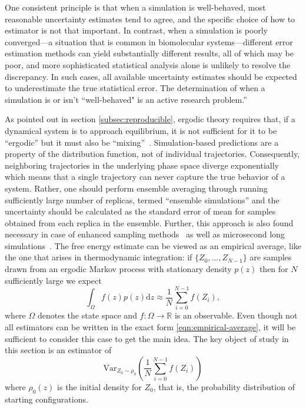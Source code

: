 \documentclass[9pt,bestpractices]{livecoms}
\begin{document}
One consistent principle is that when a simulation is well-behaved, most reasonable uncertainty estimates tend to agree, and the specific choice of how to estimator is not that important.  In contrast, when a simulation is poorly converged---a situation that is common in biomolecular systems---different error estimation methods can yield substantially different results, all of which may be poor, and more sophisticated statistical analysis alone is unlikely to resolve the discrepancy. In such cases, all available uncertainty estimates should be expected to underestimate the true statistical error. The determination of when a simulation is or isn't ``well-behaved" is an active research problem.'' %

As pointed out in section \ref{subsec:reproducible}, ergodic theory requires that, if a dynamical system is to approach equilibrium, it is not sufficient for it to be ``ergodic'' but it must also be ``mixing''~\cite{coveney2016, mdbook2025}. Simulation-based predictions are a property of the distribution function, not of individual trajectories. Consequently, neighboring trajectories in the underlying phase space diverge exponentially which means that a single trajectory can never capture the true behavior of a system. Rather, one should perform ensemble averaging through running sufficiently large number of replicas, termed ``ensemble simulations'' and the uncertainty should be calculated as the standard error of mean for samples obtained from each replica in the ensemble. Further, this approach is also found necessary in case of enhanced sampling methods~\cite{bhati2018} as well as microsecond long simulations~\cite{bhati2023}.
The free energy estimate can be viewed as an empirical average, like the one that arises in thermodynamic integration: if $\{Z_0, \dots, Z_{N-1}\}$ are samples drawn from an ergodic Markov process with stationary density $p(z)$ then for $N$ sufficiently large we expect 
\begin{equation}
    \int_\Omega f(z) p(z) \mathrm{d}z\approx \frac{1}{N}\sum_{i=0}^{N-1} f(Z_i), \label{eqn:empirical-average}
\end{equation}
where $\Omega$ denotes the state space and $f : \Omega \rightarrow \mathbb{R}$ is an observable. Even though not all estimators can be written in the exact form \eqref{eqn:empirical-average}, it will be sufficient to consider this case to get the main idea. The key object of study in this section is an estimator of 
\begin{equation}
    \mathrm{Var}_{Z_0 \sim \rho_0}\left(\frac{1}{N}\sum_{i=0}^{N-1} f(Z_i)\right)
\end{equation}
where $\rho_0(z)$ is the initial density for $Z_0$, that is, the probability distribution of starting configurations.
\end{document}
